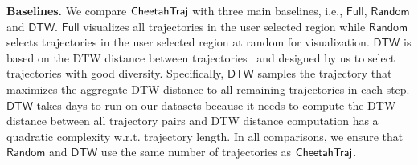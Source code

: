 \vspace{1mm}

\noindent\textbf{Baselines.} We compare $\mathsf{CheetahTraj}$ with three main baselines, i.e., $\mathsf{Full}$, $\mathsf{Random}$ and $\mathsf{DTW}$. $\mathsf{Full}$ visualizes all trajectories in the user selected region while $\mathsf{Random}$ selects trajectories in the user selected region at random for visualization. $\mathsf{DTW}$ is based on the DTW distance between trajectories~\cite{borcan2012improving} and designed by us to select trajectories with good diversity. Specifically, $\mathsf{DTW}$ samples the trajectory that maximizes the aggregate DTW distance to all remaining trajectories in each step. $\mathsf{DTW}$ takes days to run on our datasets because it needs to compute the DTW distance between all trajectory pairs and DTW distance computation has a quadratic complexity w.r.t. trajectory length.  In all comparisons, we ensure that $\mathsf{Random}$ and $\mathsf{DTW}$ use the same number of trajectories as $\mathsf{CheetahTraj}$.                    







